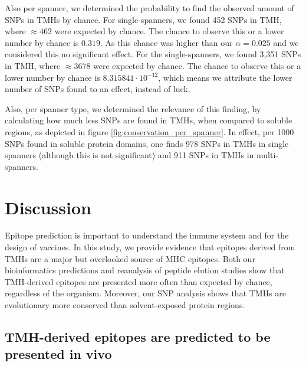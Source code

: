 Also per spanner, we determined the probability to find the 
observed amount of SNPs in TMHs by chance.
For single-spanners, we found 452 SNPs in TMH, where
$\approx462$ were expected by chance. 
The chance to observe this or a lower number by chance is 
$0.319$. As this chance was higher than our $\alpha = 0.025$
and we considered this no significant effect.
For the single-spanners, we found 3,351 SNPs in TMH, where
$\approx3678$ were expected by chance. 
The chance to observe this or a lower number by chance is 
$8.315841 \cdot 10^{-12}$, 
which means we attribute the lower number of SNPs found
to an effect, instead of luck. 

Also, per spanner type, 
we determined the relevance of this finding, by
calculating how much less SNPs are found in TMHs,
when compared to soluble regions,
as depicted in figure \ref{fig:conservation_per_spanner}.
In effect, per 1000 SNPs found in soluble protein domains, 
one finds 978 SNPs in TMHs 
in single spanners (although this is not significant)
and 911 SNPs in TMHs in multi-spanners.

\section{Discussion}


Epitope prediction is 
important to understand the immune system and for the design of vaccines. In this study, we provide evidence that epitopes
derived from TMHs are a major but overlooked source of MHC epitopes. Both our bioinformatics predictions and reanalysis of peptide elution studies show that TMH-derived epitopes are 
presented more often than expected by chance, regardless of the organism. Moreover, our SNP analysis shows  
that TMHs are evolutionary more conserved than solvent-exposed protein regions.

\subsection{TMH-derived epitopes are predicted to be presented in vivo}

